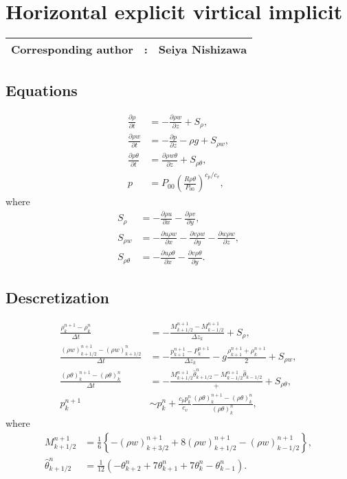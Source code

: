 \chapter{Horizontal explicit virtical implicit}
\label{chap:hevi}
{\bf \Large 
\begin{tabular}{ccc}
\hline
  Corresponding author & : & Seiya Nishizawa\\
\hline
\end{tabular}
}

\section{Equations}

\begin{align}
  \frac{\partial \rho}{\partial t}
  &= -\frac{\partial \rho w}{\partial z} + S_\rho, \\
  \frac{\partial \rho w}{\partial t}
  &= -\frac{\partial p}{\partial z} -\rho g + S_{\rho w}, \\
  \frac{\partial \rho\theta}{\partial t}
  &= \frac{\partial \rho w\theta}{\partial z} + S_{\rho\theta}, \\
  p &= P_{00}\left(\frac{R\rho\theta}{P_{00}}\right)^{c_p/c_v},
\end{align}
where
\begin{align}
  S_\rho &= - \frac{\partial \rho u}{\partial x}
           - \frac{\partial \rho v}{\partial y}, \\
  S_{\rho w} &= - \frac{\partial u\rho w}{\partial x}
              - \frac{\partial v\rho w}{\partial y}
              - \frac{\partial w\rho w}{\partial z}, \\
  S_{\rho\theta} &= - \frac{\partial u\rho\theta}{\partial x}
                 - \frac{\partial v\rho\theta}{\partial y}.
\end{align}

\section{Descretization}
\begin{align}
  \frac{\rho_k^{n+1}-\rho_k^n}{\Delta t}
  &= -\frac{M_{k+1/2}^{n+1}-M_{k-1/2}^{n+1}}{\Delta z_k} + S_\rho, \\
  \frac{(\rho w)_{k+1/2}^{n+1}-(\rho w)_{k+1/2}^n}{\Delta t}
  &= -\frac{p_{k+1}^{n+1}-P_k^{n+1}}{\Delta z_k} -g\frac{\rho_{k+1}^{n+1}+\rho_k^{n+1}}{2} + S_{\rho w}, \\
  \frac{(\rho\theta)_k^{n+1}-(\rho\theta)_k^n}{\Delta t}
  &= -\frac{M_{k+1/2}^{n+1}\hat{\theta}_{k+1/2}^n-M_{k-1/2}^{n+1}\hat{\theta}_{k-1/2}} + + S_{\rho\theta}, \\
  p_k^{n+1} &\sim p_k^n + \frac{c_pp_k^n}{c_v}\frac{(\rho\theta)_k^{n+1}-(\rho\theta)_k^n}{(\rho\theta)_k^n},
\end{align}
where
\begin{align}
  M_{k+1/2}^{n+1}
  &= \frac{1}{6}\left\{-(\rho w)_{k+3/2}^{n+1}+8(\rho w)_{k+1/2}^{n+1}-(\rho w)_{k-1/2}^{n+1}\right\}, \\
  \hat{\theta}_{k+1/2}^n
  &= \frac{1}{12}(-\theta_{k+2}^n+7\theta_{k+1}^n+7\theta_k^n-\theta_{k-1}^n).
\end{align}

